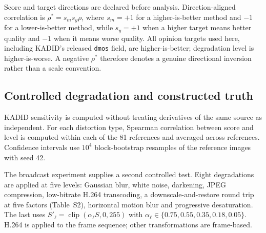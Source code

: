 Score and target directions are declared before analysis. Direction-aligned
correlation is $\rho^{*}=s_m s_y\rho$, where $s_m=+1$ for a higher-is-better
method and $-1$ for a lower-is-better method, while $s_y=+1$ when a higher
target means better quality and $-1$ when it means worse quality. All opinion
targets used here, including KADID's released \texttt{dmos} field, are
higher-is-better; degradation level is higher-is-worse. A negative $\rho^{*}$
therefore denotes a genuine directional inversion rather than a scale
convention.

\subsection{Controlled degradation and constructed truth}\label{sec:controlled}

KADID sensitivity is computed without treating derivatives of the same source
as independent. For each distortion type, Spearman correlation between score
and level is computed within each of the 81 references and averaged across
references. Confidence intervals use $10^4$ block-bootstrap resamples of the
reference images with seed 42.

The broadcast experiment supplies a second controlled test. Eight degradations
are applied at five levels: Gaussian blur, white noise, darkening, JPEG
compression, low-bitrate H.264 transcoding, a
downscale-and-restore round trip at five factors (Table~S2),
horizontal motion blur and progressive desaturation. The last uses
$S'_{\ell}=\operatorname{clip}(\alpha_{\ell}S,0,255)$ with
$\alpha_{\ell}\in\{0.75,0.55,0.35,0.18,0.05\}$. H.264 is applied to the frame
sequence; other transformations are frame-based.

